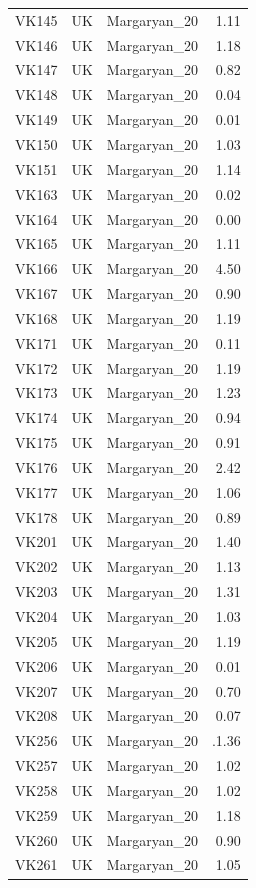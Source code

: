 \begin{longtable}[t]{lllr}
VK145 & UK & Margaryan\_20 & 1.11\\
VK146 & UK & Margaryan\_20 & 1.18\\
VK147 & UK & Margaryan\_20 & 0.82\\
VK148 & UK & Margaryan\_20 & 0.04\\
VK149 & UK & Margaryan\_20 & 0.01\\
VK150 & UK & Margaryan\_20 & 1.03\\
VK151 & UK & Margaryan\_20 & 1.14\\
VK163 & UK & Margaryan\_20 & 0.02\\
VK164 & UK & Margaryan\_20 & 0.00\\
VK165 & UK & Margaryan\_20 & 1.11\\
VK166 & UK & Margaryan\_20 & 4.50\\
VK167 & UK & Margaryan\_20 & 0.90\\
VK168 & UK & Margaryan\_20 & 1.19\\
VK171 & UK & Margaryan\_20 & 0.11\\
VK172 & UK & Margaryan\_20 & 1.19\\
VK173 & UK & Margaryan\_20 & 1.23\\
VK174 & UK & Margaryan\_20 & 0.94\\
VK175 & UK & Margaryan\_20 & 0.91\\
VK176 & UK & Margaryan\_20 & 2.42\\
VK177 & UK & Margaryan\_20 & 1.06\\
VK178 & UK & Margaryan\_20 & 0.89\\
VK201 & UK & Margaryan\_20 & 1.40\\
VK202 & UK & Margaryan\_20 & 1.13\\
VK203 & UK & Margaryan\_20 & 1.31\\
VK204 & UK & Margaryan\_20 & 1.03\\
VK205 & UK & Margaryan\_20 & 1.19\\
VK206 & UK & Margaryan\_20 & 0.01\\
VK207 & UK & Margaryan\_20 & 0.70\\
VK208 & UK & Margaryan\_20 & 0.07\\
VK256 & UK & Margaryan\_20 & .1.36\\
VK257 & UK & Margaryan\_20 & 1.02\\
VK258 & UK & Margaryan\_20 & 1.02\\
VK259 & UK & Margaryan\_20 & 1.18\\
VK260 & UK & Margaryan\_20 & 0.90\\
VK261 & UK & Margaryan\_20 & 1.05\\

\end{longtable}
